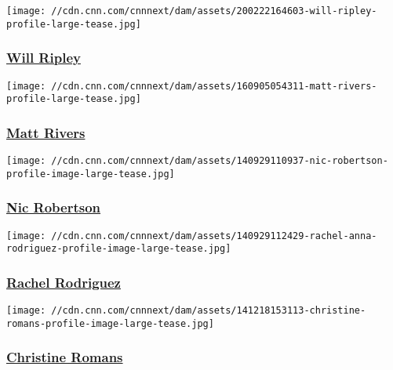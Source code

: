 \href{/profiles/will-ripley}{}

\texttt{[image: //cdn.cnn.com/cnnnext/dam/assets/200222164603-will-ripley-profile-large-tease.jpg]}

\hypertarget{will-ripley}{%
\subsubsection{\texorpdfstring{\href{/profiles/will-ripley}{Will
Ripley}}{Will Ripley}}\label{will-ripley}}

\href{/profiles/matt-rivers}{}

\texttt{[image: //cdn.cnn.com/cnnnext/dam/assets/160905054311-matt-rivers-profile-large-tease.jpg]}

\hypertarget{matt-rivers}{%
\subsubsection{\texorpdfstring{\href{/profiles/matt-rivers}{Matt
Rivers}}{Matt Rivers}}\label{matt-rivers}}

\href{/profiles/nic-robertson}{}

\texttt{[image: //cdn.cnn.com/cnnnext/dam/assets/140929110937-nic-robertson-profile-image-large-tease.jpg]}

\hypertarget{nic-robertson}{%
\subsubsection{\texorpdfstring{\href{/profiles/nic-robertson}{Nic
Robertson}}{Nic Robertson}}\label{nic-robertson}}

\href{/profiles/rachel-rodriguez}{}

\texttt{[image: //cdn.cnn.com/cnnnext/dam/assets/140929112429-rachel-anna-rodriguez-profile-image-large-tease.jpg]}

\hypertarget{rachel-rodriguez}{%
\subsubsection{\texorpdfstring{\href{/profiles/rachel-rodriguez}{Rachel
Rodriguez}}{Rachel Rodriguez}}\label{rachel-rodriguez}}

\href{/profiles/christine-romans}{}

\texttt{[image: //cdn.cnn.com/cnnnext/dam/assets/141218153113-christine-romans-profile-image-large-tease.jpg]}

\hypertarget{christine-romans}{%
\subsubsection{\texorpdfstring{\href{/profiles/christine-romans}{Christine
Romans}}{Christine Romans}}\label{christine-romans}}

